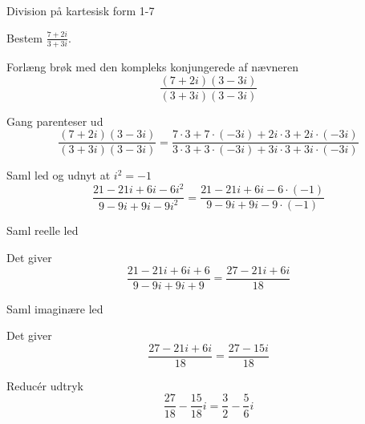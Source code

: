 \documentclass{article}
\begin{document}
\begin{exercise}{Division på kartesisk form 1-7}
	
	Bestem $\frac{7+2i}{3+3i}$.
	
	
	
	\hint 
	
	Forlæng brøk med den kompleks konjungerede af nævneren
	\[
	\frac{(7+2i)(3-3i)}{(3+3i)(3-3i)}
	\]
	
	\hint
	
	Gang parenteser ud
	\[
	\frac{(7+2i)(3-3i)}{(3+3i)(3-3i)} = \frac{7 \cdot 3 + 7 \cdot (-3i)+2i \cdot 3 + 2i \cdot (-3i)}{3 \cdot 3 + 3 \cdot (-3i) + 3i \cdot 3 + 3i \cdot (-3i)}
	\]
	
	\hint 
	
	Saml led og udnyt at $i^2 = -1$
	\[
	\frac{21 -21i +6i - 6i^2}{9 -9 i +9i-9i^2} = \frac{21 -21i +6i - 6 \cdot (-1)}{9 -9 i +9i-9 \cdot (-1)}
	\]
	
	\hint
	
	Saml reelle led
	
	\hint
	
	Det giver
	\[
	\frac{21 -21i +6i + 6 }{9 -9 i +9i+9} = \frac{27 -21i+6i}{18}
	\]
	
	\hint
	
	Saml imaginære led
	
	
	\hint
	
	Det giver 
	\[
	\frac{27 -21i+6i}{18} = \frac{27-15i}{18}
	\]
	
	\hint
	
	Reducér udtryk
	\[
	\frac{27}{18} - \frac{15}{18}i = \frac{3}{2} - \frac{5}{6}i
	\]
	
\end{exercise}

\newpage
\end{document}
